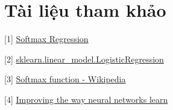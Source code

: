 \section{Tài liệu tham khảo }
[1] \href{http://ufldl.stanford.edu/tutorial/supervised/SoftmaxRegression/}{Softmax Regression} 
 
[2] \href{http://scikit-learn.org/stable/modules/generated/sklearn.linear_model.LogisticRegression.html}{sklearn.linear\_model.LogisticRegression} 
 
[3] \href{https://en.wikipedia.org/wiki/Softmax_function}{Softmax function - Wikipedia} 
 
[4] \href{http://neuralnetworksanddeeplearning.com/chap3.html}{Improving the way neural networks learn} 
 
